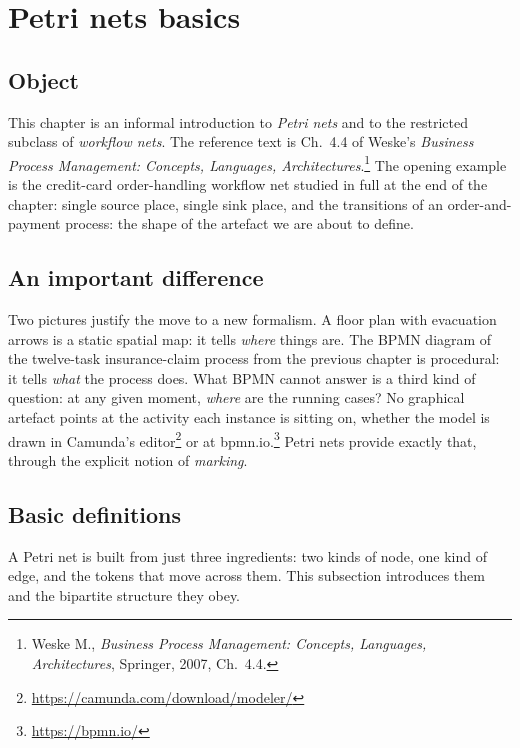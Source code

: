 \section{Petri nets basics}


\subsection{Object}

This chapter is an informal introduction to \emph{Petri nets} and to the restricted subclass of \emph{workflow nets}. The reference text is Ch.~4.4 of Weske's \emph{Business Process Management: Concepts, Languages, Architectures}.\footnote{Weske M., \emph{Business Process Management: Concepts, Languages, Architectures}, Springer, 2007, Ch.~4.4.} The opening example is the credit-card order-handling workflow net studied in full at the end of the chapter: single source place, single sink place, and the transitions of an order-and-payment process: the shape of the artefact we are about to define.

\subsection{An important difference}

Two pictures justify the move to a new formalism. A floor plan with evacuation arrows is a static spatial map: it tells \emph{where} things are. The BPMN diagram of the twelve-task insurance-claim process from the previous chapter is procedural: it tells \emph{what} the process does. What BPMN cannot answer is a third kind of question: at any given moment, \emph{where} are the running cases? No graphical artefact points at the activity each instance is sitting on, whether the model is drawn in Camunda's editor\footnote{\url{https://camunda.com/download/modeler/}} or at bpmn.io.\footnote{\url{https://bpmn.io/}} Petri nets provide exactly that, through the explicit notion of \emph{marking}.

\subsection{Basic definitions}

A Petri net is built from just three ingredients: two kinds of node, one kind of edge, and the tokens that move across them. This subsection introduces them and the bipartite structure they obey.

